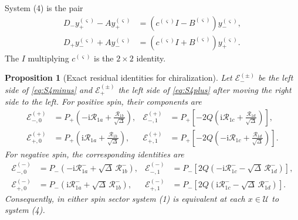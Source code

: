 \documentclass[11pt,a4paper]{article}
\numberwithin{equation}{section}
\newtheorem{proposition}[theorem]{Proposition}
\theoremstyle{definition}
\theoremstyle{remark}
\newcommand{\I}{\mathrm i}
\newcommand{\Uext}{\mathcal U}
\newcommand{\Res}{\mathcal R}
\newcommand{\cE}{\mathcal E}
\begin{document}
System (4) is the pair
\begin{align}
 D_-y_+^{(\varsigma)}-Ay_+^{(\varsigma)}
 &=\left(c^{(\varsigma)}I-B^{(\varsigma)}\right)y_-^{(\varsigma)},
\label{eq:S4minus}\\
 D_+y_-^{(\varsigma)}+Ay_-^{(\varsigma)}
 &=\left(c^{(\varsigma)}I+B^{(\varsigma)}\right)y_+^{(\varsigma)}.
\label{eq:S4plus}
\end{align}
The \(I\) multiplying \(c^{(\varsigma)}\) is the \(2\times2\) identity.

\begin{proposition}[Exact residual identities for chiralization]
\label{prop:residual}
Let \(\cE_-^{(\pm)}\) be the left side of \eqref{eq:S4minus} and
\(\cE_+^{(\pm)}\) the left side of \eqref{eq:S4plus} after moving the
right side to the left.  For positive spin, their components are
\begin{align}
 \cE_{-,0}^{(+)}
 &=P_+\left(-\I\Res_{1a}
 +\frac{\Res_{1b}}{\sqrt\Delta}\right),&
 \cE_{-,1}^{(+)}
 &=P_+\left[-2Q\left(\I\Res_{1c}
 +\frac{\Res_{1d}}{\sqrt\Delta}\right)\right],
\label{eq:positive-residuals}\\
 \cE_{+,0}^{(+)}
 &=P_+\left(\I\Res_{1a}
 +\frac{\Res_{1b}}{\sqrt\Delta}\right),&
 \cE_{+,1}^{(+)}
 &=P_+\left[-2Q\left(-\I\Res_{1c}
 +\frac{\Res_{1d}}{\sqrt\Delta}\right)\right].
\label{eq:positive-residuals-plus}
\end{align}
For negative spin, the corresponding identities are
\begin{align}
 \cE_{-,0}^{(-)}
 &=P_-\left(-\I\Res^-_{1a}
 +\sqrt\Delta\,\Res^-_{1b}\right),&
 \cE_{-,1}^{(-)}
 &=P_-\left[2Q\left(-\I\Res^-_{1c}
 -\sqrt\Delta\,\Res^-_{1d}\right)\right],
\label{eq:negative-residuals}\\
 \cE_{+,0}^{(-)}
 &=P_-\left(\I\Res^-_{1a}
 +\sqrt\Delta\,\Res^-_{1b}\right),&
 \cE_{+,1}^{(-)}
 &=P_-\left[2Q\left(\I\Res^-_{1c}
 -\sqrt\Delta\,\Res^-_{1d}\right)\right].
\label{eq:negative-residuals-plus}
\end{align}
Consequently, in either spin sector system (1) is equivalent at each
\(x\in\Uext\) to system (4).
\end{proposition}
\end{document}
